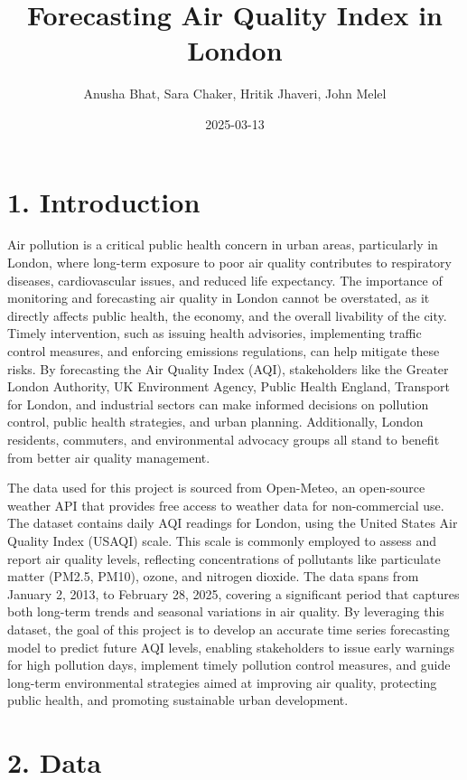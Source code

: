 \documentclass[
  12pt,
]{article}
\title{Forecasting Air Quality Index in London}
\author{Anusha Bhat, Sara Chaker, Hritik Jhaveri, John Melel}
\date{2025-03-13}
\begin{document}
\maketitle

\section{1. Introduction}\label{introduction}

Air pollution is a critical public health concern in urban areas,
particularly in London, where long-term exposure to poor air quality
contributes to respiratory diseases, cardiovascular issues, and reduced
life expectancy. The importance of monitoring and forecasting air
quality in London cannot be overstated, as it directly affects public
health, the economy, and the overall livability of the city. Timely
intervention, such as issuing health advisories, implementing traffic
control measures, and enforcing emissions regulations, can help mitigate
these risks. By forecasting the Air Quality Index (AQI), stakeholders
like the Greater London Authority, UK Environment Agency, Public Health
England, Transport for London, and industrial sectors can make informed
decisions on pollution control, public health strategies, and urban
planning. Additionally, London residents, commuters, and environmental
advocacy groups all stand to benefit from better air quality management.

The data used for this project is sourced from Open-Meteo, an
open-source weather API that provides free access to weather data for
non-commercial use. The dataset contains daily AQI readings for London,
using the United States Air Quality Index (USAQI) scale. This scale is
commonly employed to assess and report air quality levels, reflecting
concentrations of pollutants like particulate matter (PM2.5, PM10),
ozone, and nitrogen dioxide. The data spans from January 2, 2013, to
February 28, 2025, covering a significant period that captures both
long-term trends and seasonal variations in air quality. By leveraging
this dataset, the goal of this project is to develop an accurate time
series forecasting model to predict future AQI levels, enabling
stakeholders to issue early warnings for high pollution days, implement
timely pollution control measures, and guide long-term environmental
strategies aimed at improving air quality, protecting public health, and
promoting sustainable urban development.

\section{2. Data}\label{data}
\end{document}
